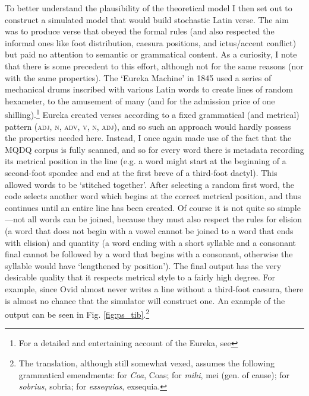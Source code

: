 \documentclass[twocolumn, switch]{article} %
\begin{document}
To better understand the plausibility of the theoretical model I then set out
to construct a simulated model that would build stochastic Latin verse. The
aim was to produce verse that obeyed the formal rules (and also respected the
informal ones like foot distribution, caesura positions, and ictus/accent
conflict) but paid no attention to semantic or grammatical content. As a
curiosity, I note that there is some precedent to this effort, although not
for the same reasons (nor with the same properties). The `Eureka Machine' in
1845 used a series of mechanical drums inscribed with various Latin words to
create lines of random hexameter, to the amusement of many (and for the
admission price of one shilling).\footnote{
  For a detailed and entertaining account of the Eureka, see 
}
Eureka created verses according to a fixed grammatical (and metrical) pattern
(\textsc{adj}, \textsc{n}, \textsc{adv}, \textsc{v}, \textsc{n},
\textsc{adj}), and so such an approach would hardly possess the properties
needed here. Instead, I once again made use of the fact that the MQDQ corpus
is fully scanned, and so for every word there is metadata recording its
metrical position in the line (e.g. a word might start at the beginning of a
second-foot spondee and end at the first breve of a third-foot dactyl). This
allowed words to be `stitched together'. After selecting a random first word,
the code selects another word which begins at the correct metrical position,
and thus continues until an entire line has been created. Of course it is not
quite so simple---not all words can be joined, because they must also respect
the rules for elision (a word that does not begin with a vowel cannot be
joined to a word that ends with elision) and quantity (a word ending with a
short syllable and a consonant final cannot be followed by a word that begins
with a consonant, otherwise the syllable would have `lengthened by position').
The final output has the very desirable quality that it respects metrical
style to a fairly high degree. For example, since Ovid almost never writes a
line without a third-foot caesura, there is almost no chance that the
simulator will construct one. An example of the output can be seen in Fig.
\ref{fig:ps_tib}.\footnote{
  The translation, although still somewhat vexed, assumes the following
  grammatical emendments: for \emph{Coa}, Coas; for \emph{mihi}, mei (gen. of
  cause); for \emph{sobrius}, sobria; for \emph{exsequias}, exsequia.
}
\end{document}
